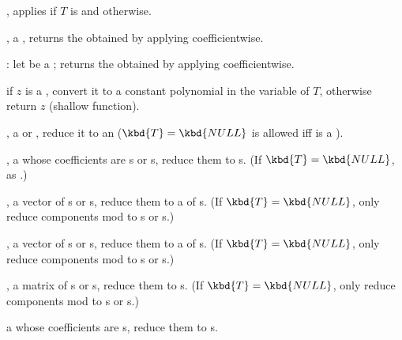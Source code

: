 , applies  if $T$
is  and  otherwise.

,  a , returns the
 obtained by applying  coefficientwise.

: let  be a ;
returns the  obtained by applying  coefficientwise.

if $z$ is a , convert it to a constant polynomial in the variable of
$T$, otherwise return $z$ (shallow function).

,  a  or ,
reduce it to an  ($\kbd{T} = \kbd{NULL}$ is allowed iff  is a
).

,  a 
whose coefficients are s or s, reduce them to s. (If
$\kbd{T} = \kbd{NULL}$, as .)

,  a vector of s or
s, reduce them to a  of s. (If $\kbd{T} = \kbd{NULL}$, only
reduce components mod  to s or s.)

,  a vector of s or
s, reduce them to a  of s. (If $\kbd{T} = \kbd{NULL}$, only
reduce components mod  to s or s.)

,  a matrix of s or
s, reduce them to s. (If $\kbd{T} = \kbd{NULL}$, only
reduce components mod  to s or s.)

  a 
whose coefficients are s, reduce them to s.







